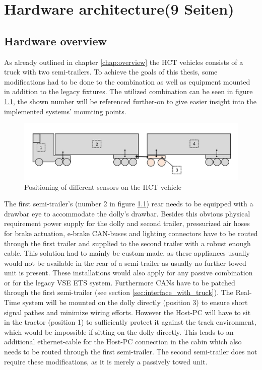 \documentclass[ExampleMasters.tex]{subfiles}
\begin{document}
\clearpage
{\pagestyle{empty}\cleardoublepage}%


\chapter{Hardware architecture(9 Seiten)}
\label{chap:hardware_setup}

\section{Hardware overview}

As already outlined in chapter \ref{chap:overview} the \gls{HCT} vehicles consists of a truck with two semi-trailers. To achieve the goals of this thesis, some modifications had to be done to the combination as well as equipment mounted in addition to the legacy fixtures. The utilized combination can be seen in figure \ref{fig:combination_overview_with_positions}, the shown number will be referenced further-on to give easier insight into the implemented systems' mounting points.

\begin{figure}[!htb]
	\centering
	\includegraphics[width=1\linewidth]{figures/combination_overview_with_positions}
	\caption{Positioning of different sensors on the \gls{HCT} vehicle}
	\label{fig:combination_overview_with_positions}
\end{figure}


The first semi-trailer's (number 2 in figure \ref{fig:combination_overview_with_positions}) rear needs to be equipped with a drawbar eye to accommodate the dolly's drawbar. Besides this obvious physical requirement power supply for the dolly and second trailer, pressurized air hoses for brake actuation, e-brake CAN-buses and lighting connectors have to be routed through the first trailer and supplied to the second trailer with a robust enough cable. This solution had to mainly be custom-made, as these appliances usually would not be available in the rear of a semi-trailer as usually no further towed unit is present. These installations would also apply for any passive combination or for the legacy \gls{VSE} \gls{ETS} system. Furthermore \gls{CAN}s have to be patched through the first semi-trailer (see section \ref{sec:interface_with_truck}). The Real-Time system will be mounted on the dolly directly (position 3) to ensure short signal pathes and minimize wiring efforts. However the Host-PC will have to sit in the tractor (position 1) to sufficiently protect it against the track environment, which would be impossible if sitting on the dolly directly. This leads to an additional ethernet-cable for the Host-PC connection in the cabin which also needs to be routed through the first semi-trailer. The second semi-trailer does not require these modifications, as it is merely a passively towed unit.
\end{document}
